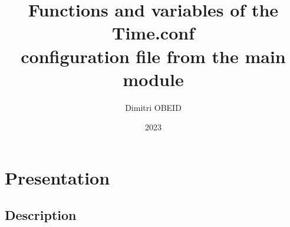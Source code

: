 \documentclass[a4paper,10pt]{article}
\title{\color{sec1}Functions and variables of the \color{path}Time.conf\color{sec1}\\configuration file from the main module}\color{text}
\author{Dimitri OBEID}
\date{2023}
\begin{document}
    \maketitle
    \newpage

    \hypertarget{contents}{}
    \tableofcontents
    \newpage

    \color{sec1}
    \section{Presentation}\color{text}

    \color{sec2}
    \subsection{Description}\color{text}
\end{document}
